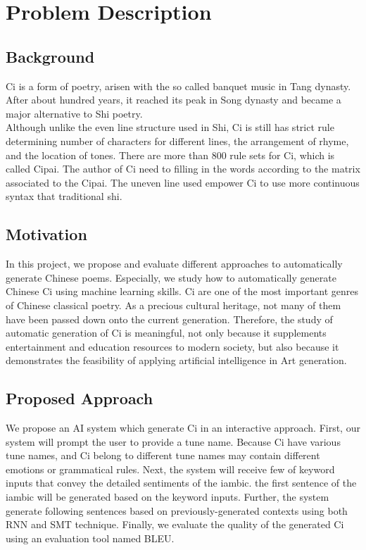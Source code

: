 \section{Problem Description}
\subsection{Background}
Ci is a form of poetry, arisen with the so called banquet music in Tang dynasty. After about hundred years, it reached its peak in Song dynasty and became a major alternative to Shi poetry\cite{cai2008chinesepoetry}.\\

Although unlike the even line structure used in Shi, Ci is still has strict rule determining number of characters for different lines, the arrangement of rhyme, and the location of tones. There are more than 800 rule sets for Ci, which is called Cipai\cite{wikici}. The author of Ci need to filling in the words according to the matrix associated to the Cipai. The uneven line used empower Ci to use more continuous syntax that traditional shi\cite{cai2008chinesepoetry}.
\subsection{Motivation}
In this project, we propose and evaluate different approaches to automatically generate Chinese poems. 
%
Especially, we study how to automatically generate Chinese Ci using machine learning skills.
%
Ci are one of the most important genres of Chinese classical poetry. 
%
As a precious cultural heritage, not many of them have been passed down onto the current generation.
%
Therefore, the study of automatic generation of Ci is meaningful, not only because it supplements entertainment and education resources to modern society, but also because it demonstrates the feasibility of applying artificial intelligence in Art generation. 
%
\subsection{Proposed Approach}
We propose an AI system which generate Ci in an interactive approach.
%
First, our system will prompt the user to provide a tune name.
%
Because Ci have various tune names, and Ci belong to different tune names may contain different emotions or grammatical rules.
%
Next, the system will receive few of keyword inputs that convey the detailed sentiments of the iambic.
%
the first sentence of the iambic will be generated based on the keyword inputs.
%
Further, the system generate following sentences based on previously-generated contexts using both RNN and SMT technique.
%
Finally, we evaluate the quality of the generated Ci using an evaluation tool named BLEU.

